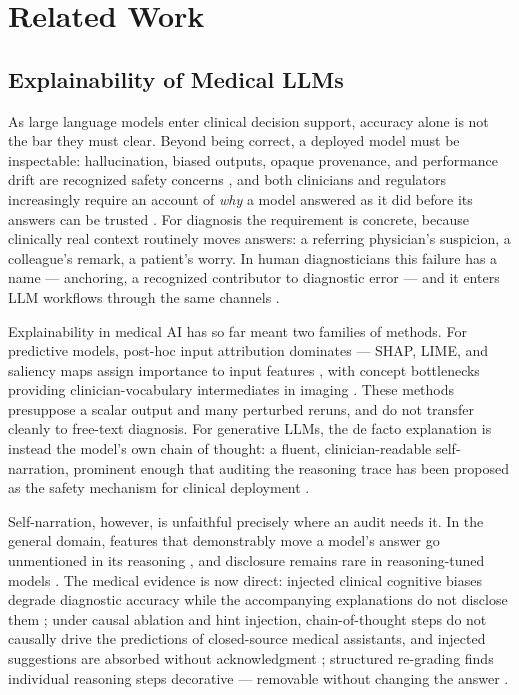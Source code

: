 
\section{Related Work}
\label{sec:related}

\subsection{Explainability of Medical LLMs}
\label{sec:related-explainability}

As large language models enter clinical decision support, accuracy alone is
not the bar they must clear. Beyond being correct, a deployed model must be
inspectable: hallucination, biased outputs, opaque provenance, and
performance drift are recognized safety concerns
\cite{wang2024safety, asgari2025hallucination, ethics2025review, chen2023drift},
and both clinicians and regulators increasingly require an account of
\emph{why} a model answered as it did before its answers can be trusted
\cite{clinicalcode2025, clinicalreasoningfails2026}. For diagnosis the
requirement is concrete, because clinically real context routinely moves
answers: a referring physician's suspicion, a colleague's remark, a
patient's worry. In human diagnosticians this failure has a name ---
anchoring, a recognized contributor to diagnostic error
\cite{croskerry2003} --- and it enters LLM workflows through the same
channels \cite{mahajan2025bias}.

Explainability in medical AI has so far meant two families of methods. For
predictive models, post-hoc input attribution dominates --- SHAP, LIME, and
saliency maps assign importance to input features
\cite{lundberg2017shap, ribeiro2016lime, xaihealthcare2026}, with concept
bottlenecks providing clinician-vocabulary intermediates in imaging
\cite{cbm2026}. These methods presuppose a scalar output and many perturbed
reruns, and do not transfer cleanly to free-text diagnosis. For generative
LLMs, the de facto explanation is instead the model's own chain of thought:
a fluent, clinician-readable self-narration, prominent enough that auditing
the reasoning trace has been proposed as the safety mechanism for clinical
deployment \cite{mahajan2025bias}.

Self-narration, however, is unfaithful precisely where an audit needs it.
In the general domain, features that demonstrably move a model's answer go
unmentioned in its reasoning \cite{turpin2023say, lanham2023measuring}, and
disclosure remains rare in reasoning-tuned models \cite{chen2025reasoning}.
The medical evidence is now direct: injected clinical cognitive biases
degrade diagnostic accuracy while the accompanying explanations do not
disclose them \cite{schmidgall2024biasmedqa, reasoningnoprotect2025}; under
causal ablation and hint injection, chain-of-thought steps do not causally
drive the predictions of closed-source medical assistants, and injected
suggestions are absorbed without acknowledgment \cite{faithfulplausible2025};
structured re-grading finds individual reasoning steps decorative ---
removable without changing the answer \cite{clinicalgraphs2026}.

